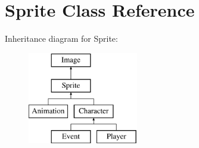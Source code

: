 \hypertarget{classSprite}{\section{Sprite Class Reference}
\label{classSprite}
}
Inheritance diagram for Sprite\-:\begin{figure}[H]
\begin{center}
\leavevmode
\includegraphics[height=4.000000cm]{classSprite}
\end{center}
\end{figure}

